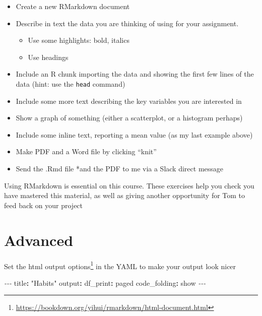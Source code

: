 \documentclass[
  12pt,
  a5paper,
]{book}
\newenvironment{Shaded}{\begin{snugshade}}{\end{snugshade}}
\newcommand{\AttributeTok}[1]{\textcolor[rgb]{0.77,0.63,0.00}{#1}}
\newcommand{\FunctionTok}[1]{\textcolor[rgb]{0.00,0.00,0.00}{#1}}
\newcommand{\KeywordTok}[1]{\textcolor[rgb]{0.13,0.29,0.53}{\textbf{#1}}}
\newcommand{\PreprocessorTok}[1]{\textcolor[rgb]{0.56,0.35,0.01}{\textit{#1}}}
\newcommand{\StringTok}[1]{\textcolor[rgb]{0.31,0.60,0.02}{#1}}
\DeclareRobustCommand{\href}[2]{#2\footnote{\url{#1}}}
\providecommand{\tightlist}{%
  \setlength{\itemsep}{0pt}\setlength{\parskip}{0pt}}
\begin{document}
\begin{itemize}
\tightlist
\item
  Create a new RMarkdown document
\item
  Describe in text the data you are thinking of using for your assignment.

  \begin{itemize}
  \tightlist
  \item
    Use some highlights: bold, italics
  \item
    Use headings
  \end{itemize}
\item
  Include an R chunk importing the data and showing the first few lines of the data (hint: use the \texttt{head} command)
\item
  Include some more text describing the key variables you are interested in
\item
  Show a graph of something (either a scatterplot, or a histogram perhaps)
\item
  Include some inline text, reporting a mean value (as my last example above)
\item
  Make PDF and a Word file by clicking ``knit''
\item
  Send the .Rmd file *and the PDF to me via a Slack direct message
\end{itemize}

Using RMarkdown is essential on this course. These exercises help you check you have mastered this material, as well as giving another opportunity for Tom to feed back on your project

\hypertarget{advanced}{%
\section{Advanced}\label{advanced}}

Set the \href{https://bookdown.org/yihui/rmarkdown/html-document.html}{html output options} in the YAML to make your output look nicer

\begin{Shaded}
\begin{Highlighting}[]
\PreprocessorTok{{-}{-}{-}}
\FunctionTok{title}\KeywordTok{:}\AttributeTok{ }\StringTok{"Habits"}
\FunctionTok{output}\KeywordTok{:}
\AttributeTok{  }\FunctionTok{df\_print}\KeywordTok{:}\AttributeTok{ }\StringTok{\textquotesingle{}paged\textquotesingle{}}
\AttributeTok{  }\FunctionTok{code\_folding}\KeywordTok{:}\AttributeTok{ }\StringTok{\textquotesingle{}show\textquotesingle{}}
\PreprocessorTok{{-}{-}{-}}
\end{Highlighting}
\end{Shaded}
\end{document}
